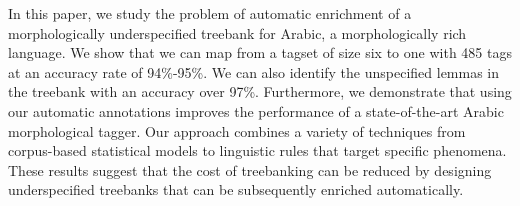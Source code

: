 In this paper, we study the problem of automatic enrichment of a morphologically underspecified treebank for Arabic, a morphologically rich
 language. We show that we can map from a tagset of size six to one with 485
 tags at an accuracy rate of 94\%-95\%. We can also identify the unspecified
 lemmas in the treebank with an accuracy over 97\%. Furthermore, we demonstrate
 that using our automatic annotations improves the performance of a
 state-of-the-art Arabic morphological tagger.  Our approach combines a variety
 of techniques from corpus-based statistical models to linguistic rules that
 target specific phenomena.  These results suggest that the cost of treebanking
 can be reduced by designing underspecified treebanks that can be subsequently
 enriched automatically.

